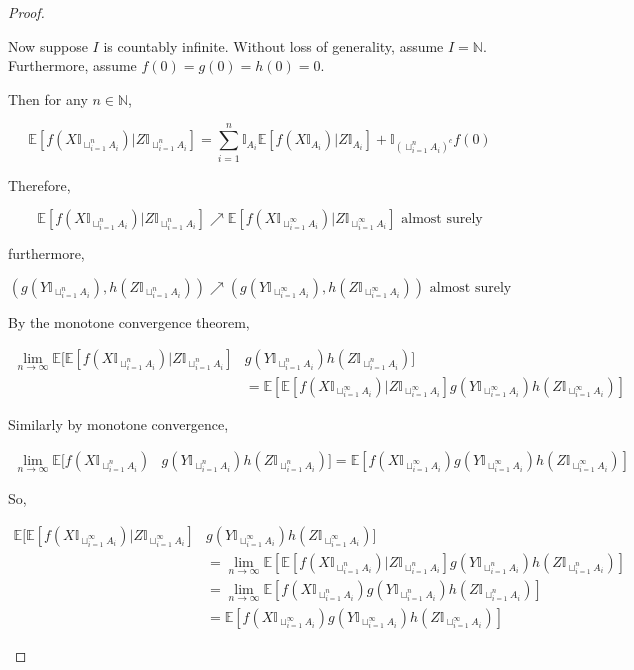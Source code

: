 \documentclass[12pt]{article}
\newcommand{\mb}{\mathbb}
\newcommand{\ra}{\rightarrow}
\newcommand{\te}{\text}
\newcommand{\ex}[1]{\mb{E}\left[#1\right]}			%
\begin{document}
\begin{proof}
\begin{enumerate}[(a)]
Now suppose \(I\) is countably infinite. Without loss of generality, assume \(I = \mb{N}\). Furthermore, assume \(f(0) = g(0) = h(0) = 0\).

Then for any \(n \in \mb{N}\),

\[\ex{f(X\mb{I}_{\sqcup_{i=1}^n A_i})|Z\mb{I}_{\sqcup_{i=1}^n A_i}} = \sum_{i=1}^n \mb{I}_{A_i}\ex{f(X\mb{I}_{A_i})|Z\mb{I}_{A_i}} + \mb{I}_{\left(\sqcup_{i=1}^n A_i\right)^c} f(0)\]

Therefore,

\[\ex{f(X\mb{I}_{\sqcup_{i=1}^n A_i})|Z\mb{I}_{\sqcup_{i=1}^n A_i}} \nearrow \ex{f(X\mb{I}_{\sqcup_{i=1}^\infty A_i})|Z\mb{I}_{\sqcup_{i=1}^\infty A_i}} \te{ almost surely}\]

furthermore, 

\[(g(Y\mb{I}_{\sqcup_{i=1}^n A_i}),h(Z\mb{I}_{\sqcup_{i=1}^n A_i})) \nearrow (g(Y\mb{I}_{\sqcup_{i=1}^\infty A_i}),h(Z\mb{I}_{\sqcup_{i=1}^\infty  A_i})) \te{ almost surely}\]

By the monotone convergence theorem,

\begin{align*}
\lim_{n\ra\infty} \mb{E}\bigg[\ex{f(X\mb{I}_{\sqcup_{i=1}^n A_i})|Z\mb{I}_{\sqcup_{i=1}^n A_i}}&g(Y\mb{I}_{\sqcup_{i=1}^n A_i})h(Z\mb{I}_{\sqcup_{i=1}^n A_i})\bigg]\\
& = \ex{\ex{f(X\mb{I}_{\sqcup_{i=1}^\infty A_i})|Z\mb{I}_{\sqcup_{i=1}^\infty A_i}}g(Y\mb{I}_{\sqcup_{i=1}^\infty A_i})h(Z\mb{I}_{\sqcup_{i=1}^\infty A_i})}
\end{align*}

Similarly by monotone convergence,

\begin{align*}
\lim_{n\ra\infty} \mb{E}\bigg[f(X\mb{I}_{\sqcup_{i=1}^n A_i})&g(Y\mb{I}_{\sqcup_{i=1}^n A_i})h(Z\mb{I}_{\sqcup_{i=1}^n A_i})\bigg] = \ex{f(X\mb{I}_{\sqcup_{i=1}^\infty A_i})g(Y\mb{I}_{\sqcup_{i=1}^\infty A_i})h(Z\mb{I}_{\sqcup_{i=1}^\infty A_i})}
\end{align*}

So,

\begin{align*}
\mb{E}\bigg[\ex{f(X\mb{I}_{\sqcup_{i=1}^\infty A_i})|Z\mb{I}_{\sqcup_{i=1}^\infty A_i}}&g(Y\mb{I}_{\sqcup_{i=1}^\infty A_i})h(Z\mb{I}_{\sqcup_{i=1}^\infty A_i})\bigg]\\
&= \lim_{n\ra\infty} \ex{\ex{f(X\mb{I}_{\sqcup_{i=1}^n A_i})|Z\mb{I}_{\sqcup_{i=1}^n A_i}}g(Y\mb{I}_{\sqcup_{i=1}^n A_i})h(Z\mb{I}_{\sqcup_{i=1}^n A_i})}\\
&= \lim_{n\ra\infty} \ex{f(X\mb{I}_{\sqcup_{i=1}^n A_i})g(Y\mb{I}_{\sqcup_{i=1}^n A_i})h(Z\mb{I}_{\sqcup_{i=1}^n A_i})}\\
&= \ex{f(X\mb{I}_{\sqcup_{i=1}^\infty A_i})g(Y\mb{I}_{\sqcup_{i=1}^\infty A_i})h(Z\mb{I}_{\sqcup_{i=1}^\infty A_i})}
\end{align*}


\end{enumerate}
\end{proof}
\end{document}

